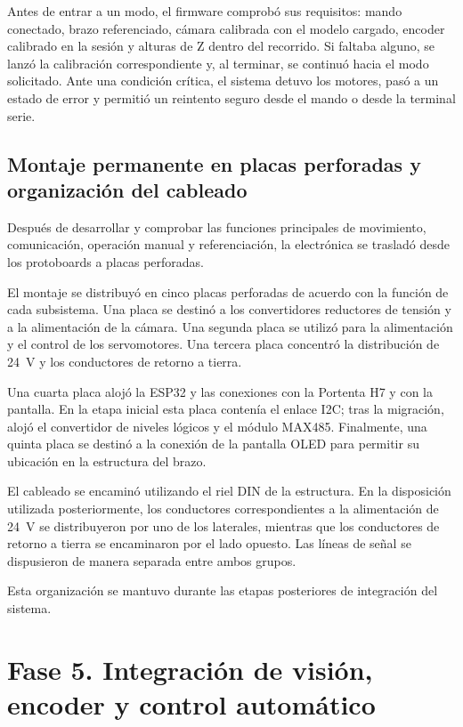 Antes de entrar a un modo, el firmware comprobó sus requisitos: mando conectado, brazo referenciado, cámara calibrada con el modelo cargado, encoder calibrado en la sesión y alturas de Z dentro del recorrido. Si faltaba alguno, se lanzó la calibración correspondiente y, al terminar, se continuó hacia el modo solicitado. Ante una condición crítica, el sistema detuvo los motores, pasó a un estado de error y permitió un reintento seguro desde el mando o desde la terminal serie.


\subsection{Montaje permanente en placas perforadas y organización del cableado}

Después de desarrollar y comprobar las funciones principales de movimiento, comunicación, operación manual y referenciación, la electrónica se trasladó desde los protoboards a placas perforadas.

El montaje se distribuyó en cinco placas perforadas de acuerdo con la función de cada subsistema. Una placa se destinó a los convertidores reductores de tensión y a la alimentación de la cámara. Una segunda placa se utilizó para la alimentación y el control de los servomotores. Una tercera placa concentró la distribución de 24~V y los conductores de retorno a tierra.

Una cuarta placa alojó la ESP32 y las conexiones con la Portenta H7 y con la pantalla. En la etapa inicial esta placa contenía el enlace I2C; tras la migración, alojó el convertidor de niveles lógicos y el módulo MAX485. Finalmente, una quinta placa se destinó a la conexión de la pantalla OLED para permitir su ubicación en la estructura del brazo.

El cableado se encaminó utilizando el riel DIN de la estructura. En la disposición utilizada posteriormente, los conductores correspondientes a la alimentación de 24~V se distribuyeron por uno de los laterales, mientras que los conductores de retorno a tierra se encaminaron por el lado opuesto. Las líneas de señal se dispusieron de manera separada entre ambos grupos.

Esta organización se mantuvo durante las etapas posteriores de integración del sistema.



\section{Fase 5. Integración de visión, encoder y control automático}

